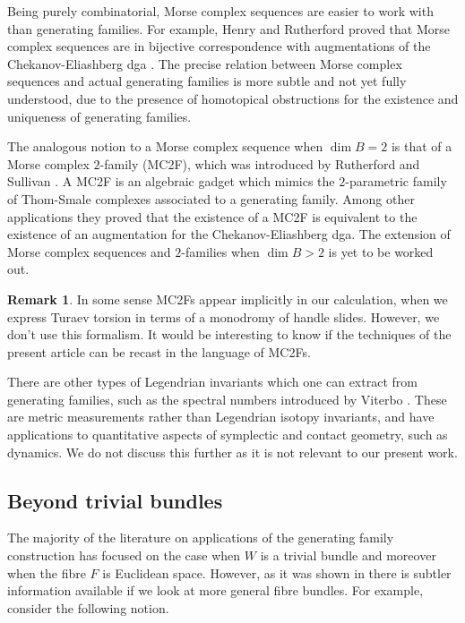 \documentclass[11pt]{article}
\numberwithin{equation}{section}\providecommand{\dpl}{\displaystyle}
\theoremstyle{plain}
\theoremstyle{definition}
\newtheorem{remark}[theorem]{Remark}
\begin{document}
Being purely combinatorial, Morse complex sequences are easier to work with than generating families. For example, Henry and Rutherford proved that Morse complex sequences are in bijective correspondence with augmentations of the Chekanov-Eliashberg dga \cite{HR15}. The precise relation between Morse complex sequences and actual generating families is more subtle and not yet fully understood, due to the presence of homotopical obstructions for the existence and uniqueness of generating families.

The analogous notion to a Morse complex sequence when $\dim B =2$ is that of a Morse complex $2$-family (MC2F), which was introduced by Rutherford and Sullivan \cite{RS18}. A MC2F is an algebraic gadget which mimics the $2$-parametric family of Thom-Smale complexes associated to a generating family. Among other applications they proved that the existence of a MC2F is equivalent to the existence of an augmentation for the Chekanov-Eliashberg dga. The extension of Morse complex sequences and $2$-families when $\dim B >2$ is yet to be worked out.

\begin{remark} In some sense MC2Fs appear implicitly in our calculation, when we express Turaev torsion in terms of a monodromy of handle slides. However, we don't use this formalism. It would be interesting to know if the techniques of the present article can be recast in the language of MC2Fs.
\end{remark}

There are other types of Legendrian invariants which one can extract from generating families, such as the spectral numbers introduced by Viterbo \cite{V92}. These are metric measurements rather than Legendrian isotopy invariants, and have applications to quantitative aspects of symplectic and contact geometry, such as dynamics. We do not discuss this further as it is not relevant to our present work.

\subsection{Beyond trivial bundles}

The majority of the literature on applications of the generating family construction has focused on the case when $W$ is a trivial bundle and moreover when the fibre $F$ is Euclidean space. However, as it was shown in \cite{EG98} there is subtler information available if we look at more general fibre bundles. For example, consider the following notion.
\end{document}
